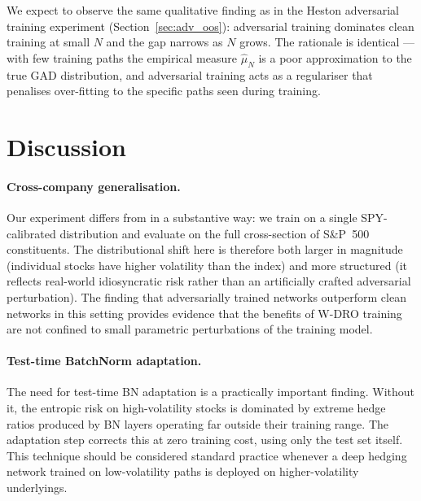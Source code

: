 We expect to observe the same qualitative finding as in the Heston adversarial
training experiment (Section~\ref{sec:adv_oos}): adversarial training
dominates clean training at small $N$ and the gap narrows as $N$ grows.  The
rationale is identical --- with few training paths the empirical measure
$\hat{\mu}_N$ is a poor approximation to the true GAD distribution, and
adversarial training acts as a regulariser that penalises over-fitting to the
specific paths seen during training.

\section{Discussion}%
\label{sec:gad_discussion}

\paragraph{Cross-company generalisation.}
Our experiment differs from \citet{he2025} in a substantive way: we train on
a single SPY-calibrated distribution and evaluate on the full cross-section of
S\&P~500 constituents.  The distributional shift here is therefore both larger
in magnitude (individual stocks have higher volatility than the index) and more
structured (it reflects real-world idiosyncratic risk rather than an
artificially crafted adversarial perturbation).  The finding that adversarially
trained networks outperform clean networks in this setting provides evidence
that the benefits of W-DRO training are not confined to small parametric
perturbations of the training model.

\paragraph{Test-time BatchNorm adaptation.}
The need for test-time BN adaptation is a practically important finding.
Without it, the entropic risk on high-volatility stocks is dominated by extreme
hedge ratios produced by BN layers operating far outside their training range.
The adaptation step corrects this at zero training cost, using only the test
set itself.  This technique should be considered standard practice whenever a
deep hedging network trained on low-volatility paths is deployed on
higher-volatility underlyings.

